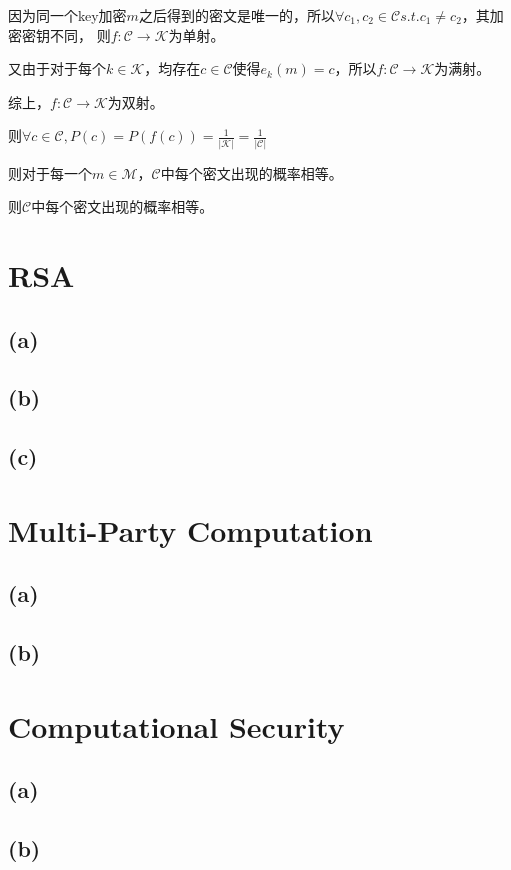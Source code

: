 \documentclass[twoside,11pt]{article}
\begin{document}
因为同一个key加密$m$之后得到的密文是唯一的，所以$\forall c_1, c_2 \in \mathcal{C} s.t. c_1 \ne c_2$，其加密密钥不同，
则$f: \mathcal{C} \to \mathcal{K}$为单射。

又由于对于每个$k \in \mathcal{K}$，均存在$c \in \mathcal{C}$使得$e_k(m) = c$，所以$f: \mathcal{C} \to \mathcal{K}$为满射。

综上，$f: \mathcal{C} \to \mathcal{K}$为双射。

则$\forall c \in \mathcal{C}, P(c)=P(f(c))=\frac{1}{|\mathcal{K}|}=\frac{1}{|\mathcal{C}|}$

则对于每一个$m \in \mathcal{M}$，$\mathcal{C}$中每个密文出现的概率相等。

则$\mathcal{C}$中每个密文出现的概率相等。


\section{RSA}
\subsection*{(a)}

\subsection*{(b)}

\subsection*{(c)}


\section{Multi-Party Computation}
\subsection*{(a)}

\subsection*{(b)}




\section{Computational Security}
\subsection*{(a)}

\subsection*{(b)}
\end{document}
